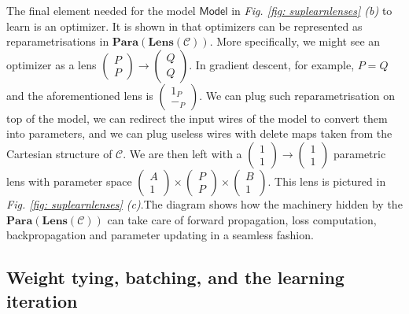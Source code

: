 \documentclass[11pt,a4paper,openright,twoside]{report}
\theoremstyle{plain}
\theoremstyle{definition}
\begin{document}
The final element needed for the model $\mathsf{Model}$ in \textit{Fig. \ref{fig: suplearnlenses} (b)} to learn is an optimizer. It is shown in \cite{cruttwell2022categorical} that optimizers can be represented as reparametrisations in $\mathbf{Para}(\mathbf{Lens}(\mathcal{C}))$. More specifically, we might see an optimizer as a lens $\left( \begin{smallmatrix} P \\ P \end{smallmatrix} \right) \to \left( \begin{smallmatrix} Q \\ Q \end{smallmatrix} \right)$. In gradient descent, for example, $P = Q$ and the aforementioned lens is $\left( \begin{smallmatrix} 1_P \\ -_P \end{smallmatrix} \right)$. We can plug such reparametrisation on top of the model, we can redirect the input wires of the model to convert them into parameters, and we can plug useless wires with delete maps taken from the Cartesian structure of $\mathcal{C}$. We are then left with a $\left(\begin{smallmatrix} 1 \\ 1 \end{smallmatrix}\right) \to \left(\begin{smallmatrix} 1 \\ 1 \end{smallmatrix}\right)$ parametric lens with parameter space $\left(\begin{smallmatrix} A \\ 1 \end{smallmatrix}\right) \times \left(\begin{smallmatrix} P \\ P \end{smallmatrix}\right) \times \left(\begin{smallmatrix} B \\ 1 \end{smallmatrix}\right)$. This lens is pictured in \textit{Fig. \ref{fig: suplearnlenses} (c)}.The diagram shows how the machinery hidden by the $\mathbf{Para}(\mathbf{Lens}(\mathcal{C}))$ can take care of forward propagation, loss computation, backpropagation and parameter updating in a seamless fashion.

\subsection{Weight tying, batching, and the learning iteration}
\end{document}
